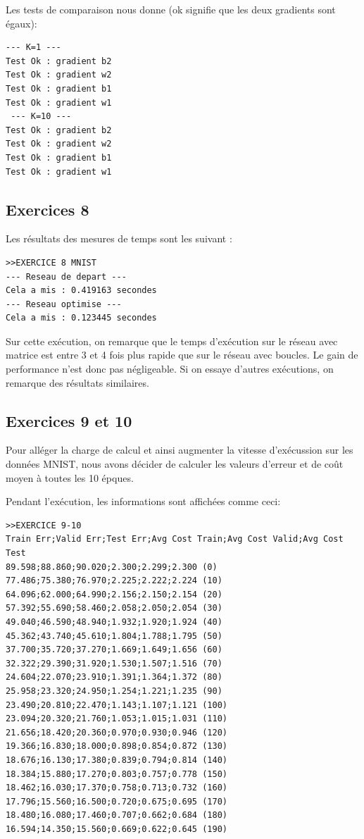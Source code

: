 \documentclass[a4paper,11pt]{article}
\begin{document}
Les tests de comparaison nous donne (ok signifie que les deux gradients sont égaux):

\begin{verbatim}
--- K=1 ---
Test Ok : gradient b2
Test Ok : gradient w2
Test Ok : gradient b1
Test Ok : gradient w1
 --- K=10 ---
Test Ok : gradient b2
Test Ok : gradient w2
Test Ok : gradient b1
Test Ok : gradient w1
\end{verbatim}


\subsection{Exercices 8}

Les résultats des mesures de temps sont les suivant : 

\begin{verbatim}
>>EXERCICE 8 MNIST
--- Reseau de depart ---
Cela a mis : 0.419163 secondes
--- Reseau optimise ---
Cela a mis : 0.123445 secondes
\end{verbatim}

Sur cette exécution, on remarque que le temps d'exécution sur le réseau avec matrice est entre 3 et 4 fois plus rapide que sur le réseau avec boucles. Le gain de performance n'est donc pas négligeable.
Si on essaye d'autres exécutions, on remarque des résultats similaires.

\subsection{Exercices 9 et 10}

Pour alléger la charge de calcul et ainsi augmenter la vitesse d'exécussion sur les données MNIST, nous avons décider de calculer les valeurs d'erreur et de coût moyen à toutes les 10 épques.

Pendant l'exécution, les informations sont affichées comme ceci:

\begin{verbatim}
>>EXERCICE 9-10
Train Err;Valid Err;Test Err;Avg Cost Train;Avg Cost Valid;Avg Cost Test
89.598;88.860;90.020;2.300;2.299;2.300 (0)
77.486;75.380;76.970;2.225;2.222;2.224 (10)
64.096;62.000;64.990;2.156;2.150;2.154 (20)
57.392;55.690;58.460;2.058;2.050;2.054 (30)
49.040;46.590;48.940;1.932;1.920;1.924 (40)
45.362;43.740;45.610;1.804;1.788;1.795 (50)
37.700;35.720;37.270;1.669;1.649;1.656 (60)
32.322;29.390;31.920;1.530;1.507;1.516 (70)
24.604;22.070;23.910;1.391;1.364;1.372 (80)
25.958;23.320;24.950;1.254;1.221;1.235 (90)
23.490;20.810;22.470;1.143;1.107;1.121 (100)
23.094;20.320;21.760;1.053;1.015;1.031 (110)
21.656;18.420;20.360;0.970;0.930;0.946 (120)
19.366;16.830;18.000;0.898;0.854;0.872 (130)
18.676;16.130;17.380;0.839;0.794;0.814 (140)
18.384;15.880;17.270;0.803;0.757;0.778 (150)
18.462;16.030;17.370;0.758;0.713;0.732 (160)
17.796;15.560;16.500;0.720;0.675;0.695 (170)
18.480;16.080;17.460;0.707;0.662;0.684 (180)
16.594;14.350;15.560;0.669;0.622;0.645 (190)
\end{verbatim}
\end{document}
